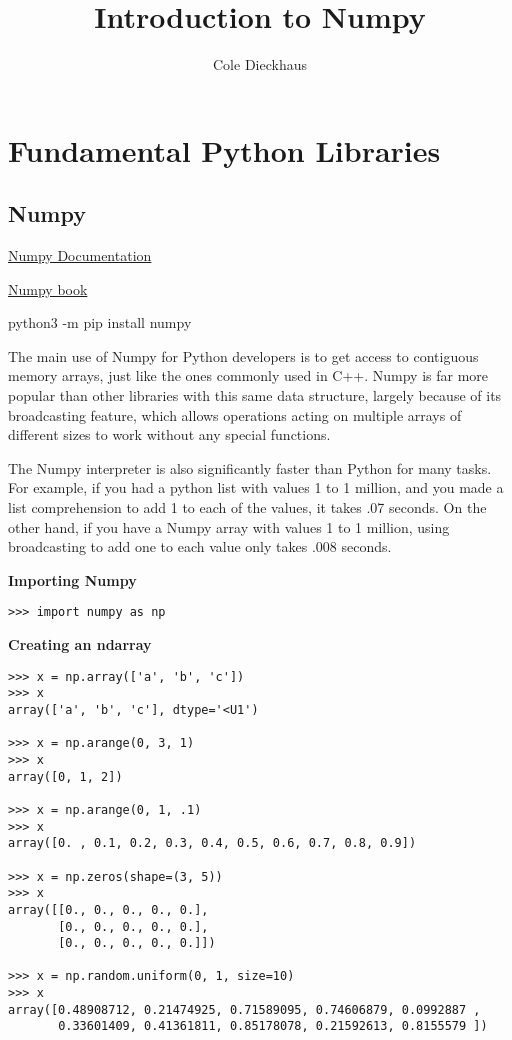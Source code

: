 \documentclass[oneside]{scrbook}
\title{Introduction to Numpy}
\author{Cole Dieckhaus}
\begin{document}
 
\maketitle 

\frontmatter 

\mainmatter 

\chapter{Fundamental Python Libraries}

\section{Numpy}
\href{https://docs.scipy.org/doc/}{Numpy Documentation}

\noindent
\href{https://docs.scipy.org/doc/\_static/numpybook.pdf}{Numpy book}

\bigskip
\noindent
python3 -m pip install numpy

\bigskip
\noindent
The main use of Numpy for Python developers is to get access to contiguous memory arrays, just like the ones commonly used in C++. Numpy is far more popular than other libraries with this same data structure, largely because of its broadcasting feature, which allows operations acting on multiple arrays of different sizes to work without any special functions.

\noindent
The Numpy interpreter is also significantly faster than Python for many tasks. For example, if you had a python list with values 1 to 1 million, and you made a list comprehension to add 1 to each of the values, it takes .07 seconds. On the other hand, if you have a Numpy array with values 1 to 1 million, using broadcasting to add one to each value only takes .008 seconds.


\bigskip
\noindent
\textbf{Importing Numpy}
\begin{verbatim}
>>> import numpy as np

\end{verbatim}

\bigskip
\noindent
\textbf{Creating an ndarray}
\begin{verbatim}
>>> x = np.array(['a', 'b', 'c'])
>>> x
array(['a', 'b', 'c'], dtype='<U1')

>>> x = np.arange(0, 3, 1)
>>> x
array([0, 1, 2])

>>> x = np.arange(0, 1, .1)
>>> x
array([0. , 0.1, 0.2, 0.3, 0.4, 0.5, 0.6, 0.7, 0.8, 0.9])

>>> x = np.zeros(shape=(3, 5))
>>> x
array([[0., 0., 0., 0., 0.],
       [0., 0., 0., 0., 0.],
       [0., 0., 0., 0., 0.]])

>>> x = np.random.uniform(0, 1, size=10)
>>> x
array([0.48908712, 0.21474925, 0.71589095, 0.74606879, 0.0992887 ,
       0.33601409, 0.41361811, 0.85178078, 0.21592613, 0.8155579 ])

\end{verbatim}
\end{document}
